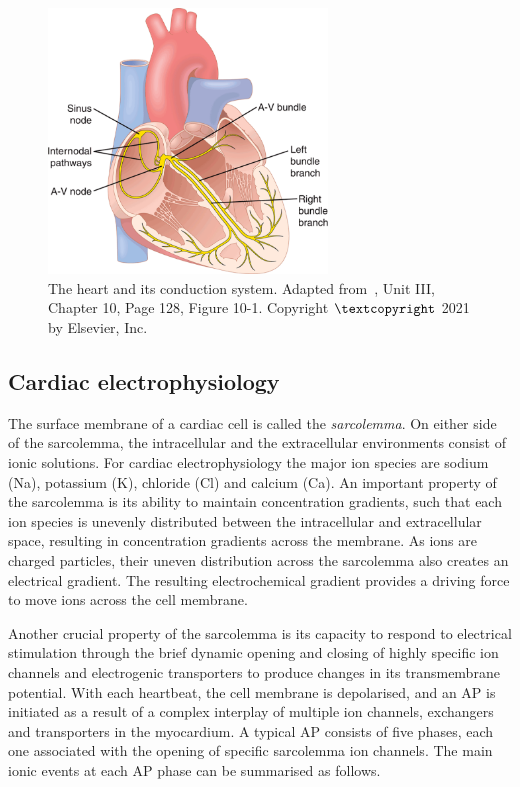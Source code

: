 \begin{figure}[!ht]
    \myfloatalign
    \includegraphics[width=0.66\textwidth]{figures/chapter01/fig8.png}
    \caption{The heart and its conduction system. Adapted from~\cite{Guyton:2021}, Unit III, Chapter 10, Page 128, Figure 10-1. Copyright $\textcopyright$ 2021 by Elsevier, Inc.}
    \label{fig:heartcondactionsystem}
\end{figure}


%
%
%
\subsection{Cardiac electrophysiology}\label{sec:ch1cardiac_electrophysiology}
The surface membrane of a cardiac cell is called the \textit{sarcolemma}. On either side of the sarcolemma, the intracellular and the extracellular environments consist of ionic solutions. For cardiac electrophysiology the major ion species are sodium (\acs{Na}), potassium (\acs{K}), chloride (\acs{Cl}) and calcium (\acs{Ca}). An important property of the sarcolemma is its ability to maintain concentration gradients, such that each ion species is unevenly distributed between the intracellular and extracellular space, resulting in concentration gradients across the membrane. As ions are charged particles, their uneven distribution across the sarcolemma also creates an electrical gradient. The resulting electrochemical gradient provides a driving force to move ions across the cell membrane.

\vspace{0.2cm}
Another crucial property of the sarcolemma is its capacity to respond to electrical stimulation through the brief dynamic opening and closing of highly specific ion channels and electrogenic transporters to produce changes in its transmembrane potential. With each heartbeat, the cell membrane is depolarised, and an AP is initiated as a result of a complex interplay of multiple ion channels, exchangers and transporters in the myocardium. A typical AP consists of five phases, each one associated with the opening of specific sarcolemma ion channels. The main ionic events at each AP phase can be summarised as follows.

